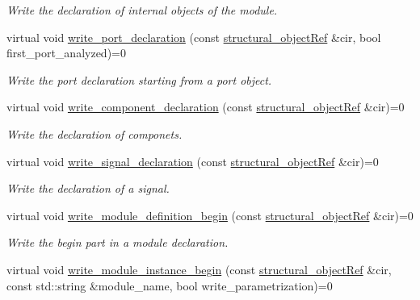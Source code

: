 \begin{DoxyCompactItemize}
\begin{DoxyCompactList}\small\item\em Write the declaration of internal objects of the module. \end{DoxyCompactList}\item 
virtual void \hyperlink{classlanguage__writer_acf6d294fc4f807691e729b0dd13bc998}{write\+\_\+port\+\_\+declaration} (const \hyperlink{structural__objects_8hpp_a8ea5f8cc50ab8f4c31e2751074ff60b2}{structural\+\_\+object\+Ref} \&cir, bool first\+\_\+port\+\_\+analyzed)=0
\begin{DoxyCompactList}\small\item\em Write the port declaration starting from a port object. \end{DoxyCompactList}\item 
virtual void \hyperlink{classlanguage__writer_a99c30813a77c594298e9d4612d2a7e29}{write\+\_\+component\+\_\+declaration} (const \hyperlink{structural__objects_8hpp_a8ea5f8cc50ab8f4c31e2751074ff60b2}{structural\+\_\+object\+Ref} \&cir)=0
\begin{DoxyCompactList}\small\item\em Write the declaration of componets. \end{DoxyCompactList}\item 
virtual void \hyperlink{classlanguage__writer_ae574f2a7e9cb7904172ce08aab243f8e}{write\+\_\+signal\+\_\+declaration} (const \hyperlink{structural__objects_8hpp_a8ea5f8cc50ab8f4c31e2751074ff60b2}{structural\+\_\+object\+Ref} \&cir)=0
\begin{DoxyCompactList}\small\item\em Write the declaration of a signal. \end{DoxyCompactList}\item 
virtual void \hyperlink{classlanguage__writer_a53b7db2b1ad81b2ee89ff81705b0f0ff}{write\+\_\+module\+\_\+definition\+\_\+begin} (const \hyperlink{structural__objects_8hpp_a8ea5f8cc50ab8f4c31e2751074ff60b2}{structural\+\_\+object\+Ref} \&cir)=0
\begin{DoxyCompactList}\small\item\em Write the begin part in a module declaration. \end{DoxyCompactList}\item 
virtual void \hyperlink{classlanguage__writer_a9fa5dba07a53f84fb2936c0c46a511a4}{write\+\_\+module\+\_\+instance\+\_\+begin} (const \hyperlink{structural__objects_8hpp_a8ea5f8cc50ab8f4c31e2751074ff60b2}{structural\+\_\+object\+Ref} \&cir, const std\+::string \&module\+\_\+name, bool write\+\_\+parametrization)=0

\end{DoxyCompactItemize}
